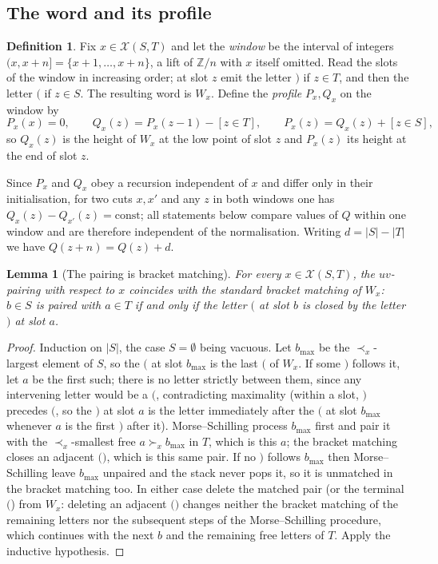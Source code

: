 \documentclass[11pt]{article}
\newtheorem{lem}[thm]{Lemma}
\theoremstyle{definition}
\newtheorem{defn}[thm]{Definition}
\newcommand{\Z}{\mathbb{Z}}
\newcommand{\XX}{\mathcal{X}}
\begin{document}
\subsection{The word and its profile}

\begin{defn}\label{def:word}
Fix $x\in\XX(S,T)$ and let the \emph{window} be the interval of integers
$(x,x+n]=\{x+1,\dots,x+n\}$, a lift of $\Z/n$ with $x$ itself omitted. Read the slots of the
window in increasing order; at slot $z$ emit the letter $\texttt{)}$ if $z\in T$, and then the
letter $\texttt{(}$ if $z\in S$. The resulting word is $W_x$. Define the \emph{profile}
$P_x,Q_x$ on the window by
\[
  P_x(x)=0,\qquad Q_x(z)=P_x(z-1)-[z\in T],\qquad P_x(z)=Q_x(z)+[z\in S] ,
\]
so $Q_x(z)$ is the height of $W_x$ at the low point of slot $z$ and $P_x(z)$ its height at the
end of slot $z$.
\end{defn}

Since $P_x$ and $Q_x$ obey a recursion independent of $x$ and differ only in their
initialisation, for two cuts $x,x'$ and any $z$ in both windows one has
$Q_x(z)-Q_{x'}(z)=\text{const}$; all statements below compare values of $Q$ within one window
and are therefore independent of the normalisation. Writing $d=|S|-|T|$ we have
$Q(z+n)=Q(z)+d$.

\begin{lem}[The pairing is bracket matching]\label{lem:bracket}
For every $x\in\XX(S,T)$, the $uv$-pairing with respect to $x$ coincides with the standard
bracket matching of $W_x$: $b\in S$ is paired with $a\in T$ if and only if the letter
$\texttt{(}$ at slot $b$ is closed by the letter $\texttt{)}$ at slot $a$.
\end{lem}

\begin{proof}
Induction on $|S|$, the case $S=\emptyset$ being vacuous. Let $b_{\max}$ be the $\prec_x$-largest
element of $S$, so the $\texttt{(}$ at slot $b_{\max}$ is the last $\texttt{(}$ of $W_x$. If
some $\texttt{)}$ follows it, let $a$ be the first such; there is no letter strictly between
them, since any intervening letter would be a $\texttt{(}$, contradicting maximality (within a
slot, $\texttt{)}$ precedes $\texttt{(}$, so the $\texttt{)}$ at slot $a$ is the letter
immediately after the $\texttt{(}$ at slot $b_{\max}$ whenever $a$ is the first
$\texttt{)}$ after it). Morse--Schilling process $b_{\max}$ first and pair it with the
$\prec_x$-smallest free $a\succ_x b_{\max}$ in $T$, which is this $a$; the bracket matching
closes an adjacent $\texttt{()}$, which is this same pair. If no $\texttt{)}$ follows
$b_{\max}$ then Morse--Schilling leave $b_{\max}$ unpaired and the stack never pops it, so it is
unmatched in the bracket matching too. In either case delete the matched pair (or the terminal
$\texttt{(}$) from $W_x$: deleting an adjacent $\texttt{()}$ changes neither the bracket
matching of the remaining letters nor the subsequent steps of the Morse--Schilling procedure,
which continues with the next $b$ and the remaining free letters of $T$. Apply the inductive
hypothesis.
\end{proof}
\end{document}
